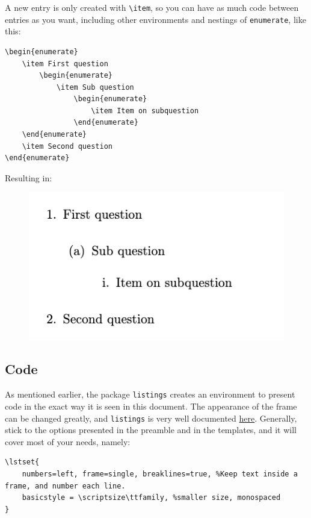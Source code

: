 A new entry is only created with \verb|\item|, so you can have as much code between entries as you want, including other environments and nestings of \verb|enumerate|, like this:
\begin{lstlisting}
\begin{enumerate}
    \item First question
        \begin{enumerate}
            \item Sub question
                \begin{enumerate}
                    \item Item on subquestion
                \end{enumerate}
    \end{enumerate}
    \item Second question
\end{enumerate}
\end{lstlisting}
Resulting in:
\begin{figure}[h]
    \centering
        \includegraphics[]{figures/list-nested.png}
    \label{fig:list-nested}
\end{figure}

\subsection{Code}
As mentioned earlier, the package \verb|listings| creates an environment to present code in the exact way it is seen in this document.
The appearance of the frame can be changed greatly, and \texttt{listings} is very well documented \href{https://texdoc.org/serve/listings.pdf/0}{here}.
Generally, stick to the options presented in the preamble and in the templates, and it will cover most of your needs, namely:

\begin{lstlisting}
\lstset{
	numbers=left, frame=single, breaklines=true, %Keep text inside a frame, and number each line.
	basicstyle = \scriptsize\ttfamily, %smaller size, monospaced
}
\end{lstlisting}

